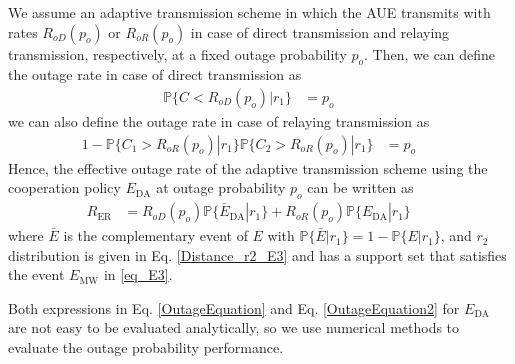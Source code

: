 \documentclass[12pt, draftclsnofoot, onecolumn]{IEEEtran}
\theoremstyle{plain}
\begin{document}
We assume an adaptive transmission scheme in which the AUE transmits with rates $R_{oD}(p_o)$ or $R_{oR}(p_o)$ in case of direct transmission and relaying transmission, respectively, at a fixed outage probability $p_o$. Then, we can define the outage rate in case of direct transmission as
%
%
\begin{align}\label{OutageEquation}
\mathbb{P}\{C  < R_{oD}(p_o)|r_1\} &= p_o&&
\end{align}
we can also define the outage rate in case of relaying transmission as
\begin{align}\label{OutageEquation2}
1-\mathbb{P}\{C_1  > R_{oR}(p_o)|r_1\}\mathbb{P}\{C_2  > R_{oR}(p_o)|r_1\} &= p_o&&
\end{align}
Hence, the effective outage rate of the adaptive transmission scheme using the cooperation policy $E_{\text{DA}}$ at outage probability $p_o$ can be written as
\begin{align}
R_{\text{ER}}&=R_{oD}(p_o) \mathbb{P}\{\bar{E}_{\text{DA}}|r_1\}+R_{oR}(p_o) \mathbb{P}\{E_{\text{DA}}|r_1\} &&
\end{align}
where $\bar{E}$ is the complementary event of ${E}$ with $\mathbb{P}\{ \bar{E}|r_1\}=1- \mathbb{P}\{ {E}|r_1\}$, and $r_2$ distribution is given in Eq. \eqref{Distance_r2_E3} and has a support set that satisfies the event $E_{\text{MW}}$ in \eqref{eq_E3}. %

Both expressions in Eq. \eqref{OutageEquation} and Eq. \eqref{OutageEquation2} for $E_{\text{DA}}$ are not easy to be evaluated analytically, so we use numerical methods to evaluate the outage probability performance.
\fi
\vspace{-0.1in}
\end{document}
